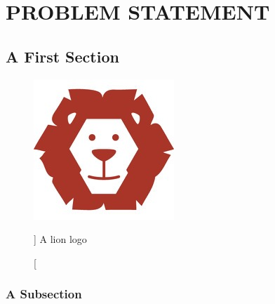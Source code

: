 \chapter{PROBLEM STATEMENT}


\section{A First Section}

\lipsum[5-7]

\begin{figure}
    \centering
    \includegraphics[scale=1]{pic/ch1/lion-logo.jpg}
    \caption%
    []
    {A lion logo}
    \label{fig:lionlogo}
\end{figure}




\subsection{A Subsection}



\lipsum[8-10]\autocite{latexcompanion}

